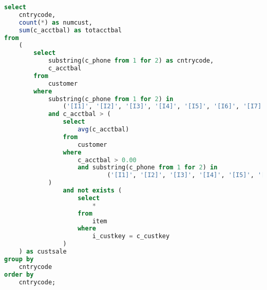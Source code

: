 \begin{enumerate}
	\begin{lstlisting}[language=SQL]
select
    cntrycode,
    count(*) as numcust,
    sum(c_acctbal) as totacctbal
from
    (
        select
            substring(c_phone from 1 for 2) as cntrycode,
            c_acctbal
        from
            customer
        where
            substring(c_phone from 1 for 2) in
                ('[I1]', '[I2]', '[I3]', '[I4]', '[I5]', '[I6]', '[I7]')
            and c_acctbal > (
                select
                    avg(c_acctbal)
                from
                    customer
                where
                    c_acctbal > 0.00
                    and substring(c_phone from 1 for 2) in
                            ('[I1]', '[I2]', '[I3]', '[I4]', '[I5]', '[I6]', '[I7]')
            )
                and not exists (
                    select
                        *
                    from
                        item
                    where
                        i_custkey = c_custkey
                )
    ) as custsale
group by
    cntrycode
order by
    cntrycode;
	\end{lstlisting}

\end{enumerate}